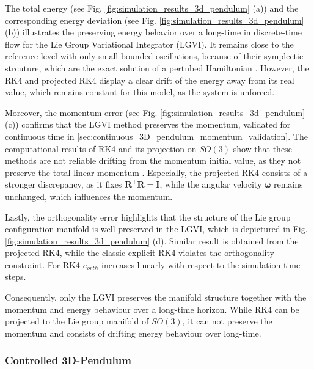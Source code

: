 The total energy (see Fig. \ref{fig:simulation_results_3d_pendulum} (a)) and the corresponding energy deviation (see Fig. \ref{fig:simulation_results_3d_pendulum} (b)) illustrates the preserving energy behavior over a long-time in discrete-time flow for the Lie Group Variational Integrator (LGVI). It remains close to the reference level with only small bounded oscillations, because of their symplectic strcuture, which are the exact solution of a pertubed Hamiltonian \cite{Hairer1994}. However, the RK4 and projected RK4 display a clear drift of the energy away from its real value, which remains constant for this model, as the system is unforced.

Moreover, the momentum error (see Fig. \ref{fig:simulation_results_3d_pendulum} (c)) confirms that the LGVI method preserves the momentum, validated for continuous time in \ref{sec:continuous_3D_pendulum_momentum_validation}. The computational results of RK4 and its projection on $SO(3)$ show that these methods are not reliable drifting from the momentum initial value, as they not preserve the total linear momentum \cite{Lee2008}. Especially, the projected RK4 consists of a stronger discrepancy, as it fixes $\bm{R}^\top\bm{R} = \bm{I}$, while the angular velocity $\bm{\omega}$ remains unchanged, which influences the momentum.

Lastly, the orthogonality error highlights that the structure of the Lie group configuration manifold is well preserved in the LGVI, which is depictured in Fig. \ref{fig:simulation_results_3d_pendulum} (d). Similar result is obtained from the projected RK4, while the classic explicit RK4 violates the orthogonality constraint. For RK4 $e_{orth}$ increases linearly with respect to the simulation time-steps.

Consequently, only the LGVI preserves the manifold structure together with the momentum and energy behaviour over a long-time horizon. While RK4 can be projected to the Lie group manifold of $SO(3)$, it can not preserve the momentum and consists of drifting energy behaviour over long-time.

\subsubsection{Controlled 3D-Pendulum}

